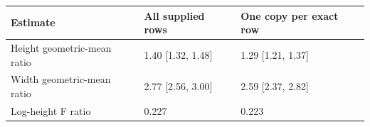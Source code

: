 \begin{tabular}{lll}
\toprule
Estimate & All supplied rows & One copy per exact row
\\
\midrule
Height geometric-mean ratio & 1.40 [1.32, 1.48] & 1.29 [1.21, 1.37]
\\
Width geometric-mean ratio & 2.77 [2.56, 3.00] & 2.59 [2.37, 2.82]
\\
Log-height F ratio & 0.227 & 0.223
\\
\bottomrule
\end{tabular}
